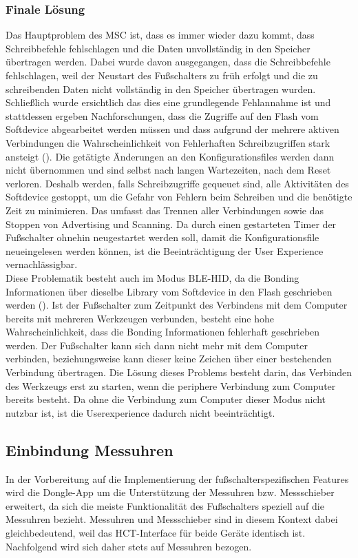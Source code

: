 \subsubsection{Finale Lösung}
Das Hauptproblem des \ac{MSC} ist, dass es immer wieder dazu kommt, dass Schreibbefehle fehlschlagen und die Daten unvollständig in den Speicher übertragen werden. Dabei wurde davon ausgegangen, dass die Schreibbefehle fehlschlagen, weil der Neustart des Fußschalters zu früh erfolgt und die zu schreibenden Daten nicht vollständig in den Speicher übertragen wurden. Schließlich wurde ersichtlich das dies eine grundlegende Fehlannahme ist und stattdessen ergeben Nachforschungen, dass die Zugriffe auf den Flash vom Softdevice abgearbeitet werden müssen und dass aufgrund der mehrere aktiven Verbindungen die Wahrscheinlichkeit von Fehlerhaften Schreibzugriffen stark ansteigt (\cite[Abschnitt SoftDevice Backend]{NRF_fstorage}). Die getätigte Änderungen an den Konfigurationsfiles werden dann nicht übernommen und sind selbst nach langen Wartezeiten, nach dem Reset verloren. Deshalb werden, falls Schreibzugriffe gequeuet sind, alle Aktivitäten des Softdevice gestoppt, um die Gefahr von Fehlern beim Schreiben und die benötigte Zeit zu minimieren. Das umfasst das Trennen aller Verbindungen sowie das Stoppen von Advertising und Scanning. Da durch einen gestarteten Timer der Fußschalter ohnehin neugestartet werden soll, damit die Konfigurationsfile neueingelesen werden können, ist die Beeinträchtigung der User Experience vernachlässigbar.\\
Diese Problematik besteht auch im Modus \ac{BLE}-\ac{HID}, da die Bonding Informationen über dieselbe Library vom Softdevice in den Flash geschrieben werden (\cite{NRF_PeerManager}). Ist der Fußschalter zum Zeitpunkt des Verbindens mit dem Computer bereits mit mehreren Werkzeugen verbunden, besteht eine hohe Wahrscheinlichkeit, dass die Bonding Informationen fehlerhaft geschrieben werden. Der Fußschalter kann sich dann nicht mehr mit dem Computer verbinden, beziehungsweise kann dieser keine Zeichen über einer bestehenden Verbindung übertragen. Die Lösung dieses Problems besteht darin, das Verbinden des Werkzeugs erst zu starten, wenn die periphere Verbindung zum Computer bereits besteht. Da ohne die Verbindung zum Computer dieser Modus nicht nutzbar ist, ist die Userexperience dadurch nicht beeinträchtigt.

\subsection{Einbindung Messuhren}
\label{EinbindungMessuhren}
In der Vorbereitung auf die Implementierung der fußschalterspezifischen Features wird die Dongle-App um die Unterstützung der Messuhren bzw. Messschieber erweitert, da sich die meiste Funktionalität des Fußschalters speziell auf die Messuhren bezieht. Messuhren und Messschieber sind in diesem Kontext dabei gleichbedeutend, weil das \ac{HCT}-Interface für beide Geräte identisch ist. Nachfolgend wird sich daher stets auf Messuhren bezogen.

